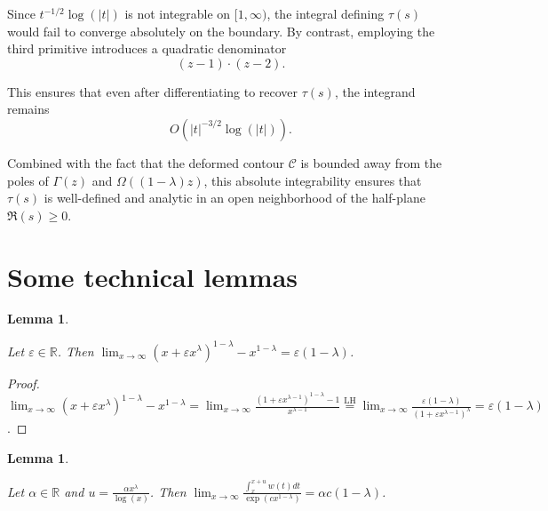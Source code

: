 \documentclass[11pt]{amsart}
\newtheorem{lemma}[theorem]{Lemma}
\numberwithin{equation}{section}
\newcommand{\R}{\mathbb{R}}
\newcommand{\diint}{\displaystyle \int}
\newcommand{\dilim}{\displaystyle \lim}
\newcommand{\difrac}{\displaystyle \frac}
\begin{document}
Since $t^{-1/2} \log(|t|)$ is not integrable on $[1, \infty)$, the integral defining $\tau(s)$ would fail to converge absolutely on the boundary. By contrast, employing the third primitive introduces a quadratic denominator $$(z-1) \cdot (z-2).$$

This ensures that even after differentiating to recover $\tau(s)$, the integrand remains $$O\left(|t|^{-3/2} \log(|t|)\right).$$

Combined with the fact that the deformed contour $\mathcal{C}$ is bounded away from the poles of $\Gamma(z)$ and $\Omega((1 - \lambda)z)$, this absolute integrability ensures that $\tau(s)$ is well-defined and analytic in an open neighborhood of the half-plane $\Re(s) \geq 0$.

\section{Some technical lemmas} \label{section3}

\begin{lemma} \label{lemma1}

Let $\varepsilon \in \R$. Then $\dilim_{x \to \infty} (x + \varepsilon x^\lambda)^{1 - \lambda} - x^{1 - \lambda} = \varepsilon (1 - \lambda)$.

\end{lemma}

\begin{proof} $\dilim_{x \to \infty} (x + \varepsilon x^\lambda)^{1 - \lambda} - x^{1 - \lambda} = \dilim_{x \to \infty} \difrac{(1 + \varepsilon x^{\lambda - 1})^{1 - \lambda} - 1}{x^{\lambda - 1}} \overset{\text{LH}}{=} \dilim_{x \to \infty} \difrac{\varepsilon (1 - \lambda)}{(1 + \varepsilon x^{\lambda - 1})^{\lambda}} = \varepsilon (1 - \lambda)$. \end{proof}

\begin{lemma} \label{integrallimsup}

Let $\alpha \in \R$ and $u = \difrac{\alpha x^{\lambda}}{\log(x)}$. Then $\dilim_{x \to \infty} \difrac{\diint_{x}^{x + u} w(t) dt}{\exp(cx^{1 - \lambda})} = \alpha c(1 - \lambda)$.

\end{lemma}
\end{document}
